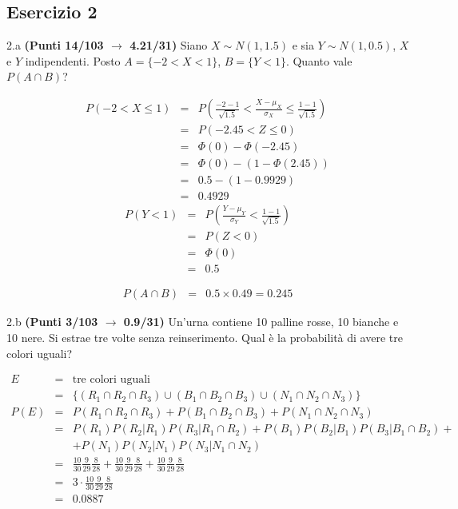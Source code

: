 \documentclass[
  11pt,
]{book}
\theoremstyle{mytheoremstyle}
\theoremstyle{mydefstyle}
\newenvironment{sol}
  {
  \begin{tcolorbox}[enhanced,breakable,arc=0.1mm,boxrule=1pt,colback=white,colframe=iblue,
  title=\bf \fontfamily{lmss}\selectfont \hspace{.5 cm} Soluzione,drop fuzzy shadow]

}{
\end{tcolorbox}
  }
\begin{document}
\subsection{Esercizio 2}\label{esercizio-2-23}

2.a \textbf{(Punti 14/103 \(\rightarrow\) 4.21/31)} Siano \(X\sim N(1,1.5)\) e sia \(Y\sim N(1,0.5)\), \(X\) e \(Y\) indipendenti. Posto \(A=\{-2<X<1\}\), \(B=\{Y<1\}\).
Quanto vale \(P(A\cap B)\)?

\begin{sol}
\begin{eqnarray*}
   P( -2 < X \leq  1 ) &=& P\left( \frac { -2  -  1 }{\sqrt{ 1.5 }} < \frac { X  -  \mu_X }{ \sigma_X } \leq \frac { 1  -  1 }{\sqrt{ 1.5 }}\right)  \\
              &=& P\left(  -2.45  < Z \leq  0 \right) \\
              &=& \Phi( 0 )-\Phi( -2.45 )\\
              &=&  \Phi( 0 )-(1-\Phi( 2.45 )) \\ &=&  0.5 -(1- 0.9929 ) \\ 
              &=&  0.4929 
   \end{eqnarray*}
\begin{eqnarray*}
      P( Y   <   1 ) 
        &=& P\left(  \frac { Y  -  \mu_Y }{ \sigma_Y }  <  \frac { 1  -  1 }{\sqrt{ 1.5 }} \right)  \\
                 &=& P\left(  Z   <   0 \right) \\    
                 &=&  \Phi( 0 ) \\ &=&  0.5 
      \end{eqnarray*}

\begin{eqnarray*}
  P(A\cap B) &=&0.5\times 0.49 = 0.245
\end{eqnarray*}

\end{sol}

2.b \textbf{(Punti 3/103 \(\rightarrow\) 0.9/31)} Un'urna contiene 10 palline rosse, 10 bianche e 10 nere. Si estrae tre volte senza reinserimento. Qual è la probabilità di avere tre colori uguali?

\begin{sol}
\begin{eqnarray*}
  E &=& \text{tre colori uguali}\\
   &=& \{(R_1\cap R_2 \cap R_3)\cup (B_1\cap B_2 \cap B_3)\cup (N_1\cap N_2 \cap N_3)\}\\
P(E) &=& P(R_1\cap R_2 \cap R_3) + P(B_1\cap B_2 \cap B_3) + P(N_1\cap N_2 \cap N_3)\\
&=& P(R_1)P(R_2|R_1)P(R_3|R_1\cap R_2)+P(B_1)P(B_2|B_1)P(B_3|B_1\cap B_2)+\\
& & + P(N_1)P(N_2|N_1)P(N_3|N_1\cap N_2)\\
&=& \frac {10}{30}\frac 9{29}\frac 8{28} + \frac {10}{30}\frac 9{29}\frac 8{28} +\frac {10}{30}\frac 9{29}\frac 8{28} \\
&=& 3\cdot \frac {10}{30}\frac 9{29}\frac 8{28} \\
&=& 0.0887
\end{eqnarray*}

\end{sol}
\end{document}
